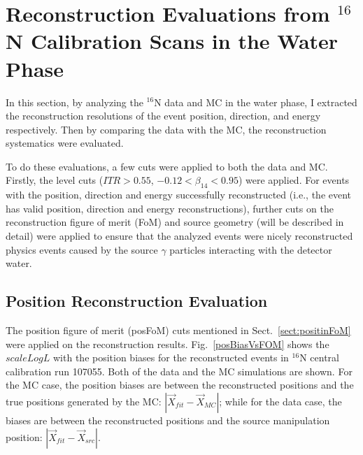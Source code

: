 \section{Reconstruction Evaluations from $^{16}$N Calibration Scans in the Water Phase}

In this section, by analyzing the $^{16}$N data and MC in the water phase, I extracted the reconstruction resolutions of the event position, direction, and energy respectively. Then by comparing the data with the MC, the reconstruction systematics were evaluated.

To do these evaluations, a few cuts were applied to both the data and MC. Firstly, the level cuts  ($ITR>0.55$, $-0.12<\beta_{14}<0.95$) were applied. For events with the position, direction and energy successfully reconstructed (i.e., the event has valid position, direction and energy reconstructions), further cuts on the reconstruction figure of merit (FoM) and source geometry (will be described in detail) were applied to ensure that the analyzed events were nicely reconstructed physics events caused by the source $\gamma$ particles interacting with the detector water.

\subsection{Position Reconstruction Evaluation}
The position figure of merit (posFoM) cuts mentioned in Sect.~\ref{sect:positinFoM} were applied on the reconstruction results. Fig.~\ref{posBiasVsFOM} shows the $scaleLogL$ with the position biases for the reconstructed events in $^{16}$N central calibration run 107055. Both of the data and the MC simulations are shown. For the MC case, the position biases are between the reconstructed positions and the true positions generated by the MC: $|\vec{X}_{fit}-\vec{X}_{MC}|$; while for the data case, the biases are between the reconstructed positions and the source manipulation position: $|\vec{X}_{fit}-\vec{X}_{src}|$.

